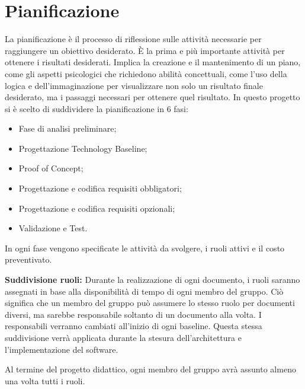 \chapter{Pianificazione}
La pianificazione è il processo di riflessione sulle attività necessarie per raggiungere un obiettivo desiderato. È la prima e più importante attività per ottenere i risultati desiderati. Implica la creazione e il mantenimento di un piano, come gli aspetti psicologici che richiedono abilità concettuali, come l'uso della logica e dell'immaginazione per visualizzare non solo un risultato finale desiderato, ma i passaggi necessari per ottenere quel risultato. In questo progetto si è scelto di suddividere la pianificazione in 6 fasi: 
\begin{itemize}
    \item Fase di analisi preliminare;
    \item Progettazione Technology Baseline;
    \item Proof of Concept;
    \item Progettazione e codifica requisiti obbligatori;
    \item Progettazione e codifica requisiti opzionali;
    \item Validazione e Test.
\end{itemize}
In ogni fase vengono specificate le attività da svolgere, i ruoli attivi e il costo preventivato.

\textbf{Suddivisione ruoli:}
Durante la realizzazione di ogni documento, i ruoli saranno assegnati in base alla disponibilità di tempo di ogni membro del gruppo. Ciò significa che un membro del gruppo può assumere lo stesso ruolo per documenti diversi, ma sarebbe responsabile soltanto di un documento alla volta. I responsabili verranno cambiati all'inizio di ogni baseline. Questa stessa suddivisione verrà applicata durante la stesura dell'architettura e l'implementazione del software.

Al termine del progetto didattico, ogni membro del gruppo avrà assunto almeno una volta tutti i ruoli.











